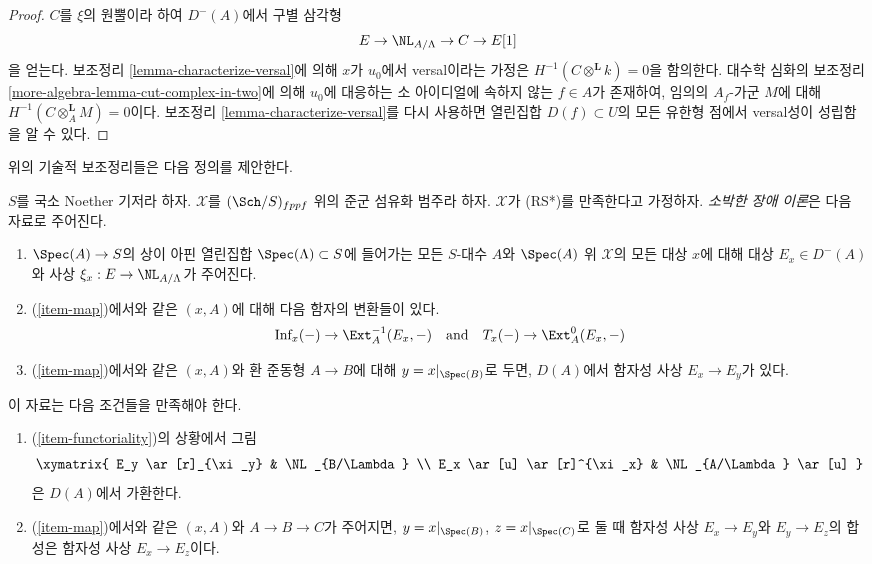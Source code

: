 \begin{proof}
$C$를 $\xi$의 원뿔이라 하여 $D^{-}(A)$에서 구별 삼각형
$$
E \to \NL_{A/\Lambda} \to C \to E[1]
$$
을 얻는다. 보조정리 \ref{lemma-characterize-versal}에 의해
$x$가 $u_0$에서 versal이라는 가정은 $H^{-1}(C \otimes^\mathbf{L} k) = 0$을
함의한다. 대수학 심화의 보조정리
\ref{more-algebra-lemma-cut-complex-in-two}에 의해 $u_0$에 대응하는
소 아이디얼에 속하지 않는 $f \in A$가 존재하여,
임의의 $A_f$-가군 $M$에 대해 $H^{-1}(C \otimes^\mathbf{L}_A M) = 0$이다.
보조정리 \ref{lemma-characterize-versal}를 다시 사용하면
열린집합 $D(f) \subset U$의 모든 유한형 점에서 versal성이 성립함을
알 수 있다.
\end{proof}

\noindent
위의 기술적 보조정리들은 다음 정의를 제안한다.

\begin{definition}
\label{definition-naive-obstruction-theory}
$S$를 국소 Noether 기저라 하자. $\mathcal{X}$를
$(\Sch/S)_{fppf}$ 위의 준군 섬유화 범주라 하자.
$\mathcal{X}$가 (RS*)를 만족한다고 가정하자.
{\it 소박한 장애 이론}은 다음 자료로 주어진다.
\begin{enumerate}
\item
\label{item-map}
$\Spec(A) \to S$의 상이 아핀 열린집합 $\Spec(\Lambda) \subset S$에
들어가는 모든 $S$-대수 $A$와 $\Spec(A)$ 위 $\mathcal{X}$의 모든 대상
$x$에 대해 대상 $E_x \in D^-(A)$와
사상 $\xi_x : E \to \NL_{A/\Lambda}$가 주어진다.
\item
\label{item-inf}
(\ref{item-map})에서와 같은 $(x, A)$에 대해 다음 함자의 변환들이 있다.
$$
\text{Inf}_x( - ) \to \Ext^{-1}_A(E_x, -)
\quad\text{and}\quad
T_x(-) \to \Ext^0_A(E_x, -)
$$
\item
\label{item-functoriality}
(\ref{item-map})에서와 같은 $(x, A)$와 환 준동형 $A \to B$에 대해
$y = x|_{\Spec(B)}$로 두면, $D(A)$에서 함자성 사상 $E_x \to E_y$가 있다.
\end{enumerate}
이 자료는 다음 조건들을 만족해야 한다.
\begin{enumerate}
\item[(i)]
(\ref{item-functoriality})의 상황에서 그림
$$
\xymatrix{
E_y \ar[r]_{\xi_y} & \NL_{B/\Lambda} \\
E_x \ar[u] \ar[r]^{\xi_x} & \NL_{A/\Lambda} \ar[u]
}
$$
은 $D(A)$에서 가환한다.
\item[(ii)]
(\ref{item-map})에서와 같은 $(x, A)$와 $A \to B \to C$가 주어지면,
$y = x|_{\Spec(B)}$, $z = x|_{\Spec(C)}$로 둘 때 함자성 사상
$E_x \to E_y$와 $E_y \to E_z$의 합성은 함자성 사상 $E_x \to E_z$이다.

\end{enumerate}
\end{definition}

